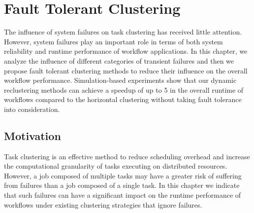 \chapter{Fault Tolerant Clustering}

The influence of system failures on task clustering has received little attention. However, system failures play an important role in terms of both system reliability and runtime performance of workflow applications. In this chapter, we analyze the influence of different categories of transient failures and then we propose fault tolerant clustering methods to reduce their influence on the overall workflow performance. Simulation-based experiments show that our dynamic reclustering methods can achieve a speedup of up to 5 in the overall runtime of workflows compared to the horizontal clustering without taking fault tolerance into consideration. 

\section{Motivation}

Task clustering is an effective method to reduce scheduling overhead and increase the computational granularity of tasks executing on distributed resources. However, a job composed of multiple tasks may have a greater risk of suffering from failures than a job composed of a single task. In this chapter we indicate that such failures can have a significant impact on the runtime performance of workflows under existing clustering strategies that ignore failures. 

